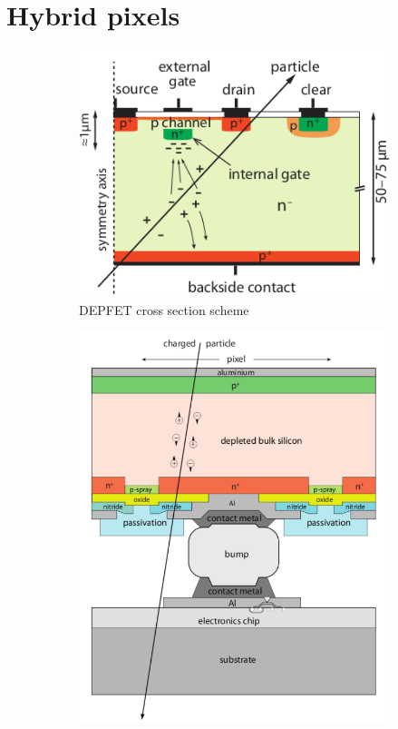 \section{Hybrid pixels}
   \begin{figure}
      \centering
      \begin{subfigure}[b]{0.49\textwidth}
         \centering
         \includegraphics[width=\linewidth]{figures/Pixel_detectors/DEPFET_scheme.png}
         \caption{DEPFET cross section scheme}
         \label{fig:DEPFET_scheme}
      \end{subfigure}
      \hfill
      \begin{subfigure}[b]{0.49\textwidth}
         \centering
         \includegraphics[width=\linewidth]{figures/Pixel_detectors/hybrid_scheme.png} 

\end{subfigure}
\end{figure}
